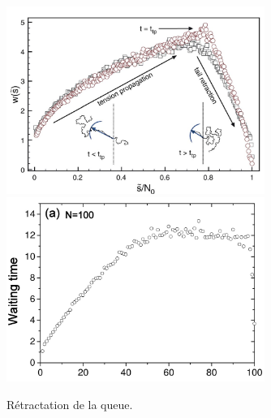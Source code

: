  \begin{figure}[H]
\begin{center}
\includegraphics[width=0.75\textwidth]{tailretractinpore.jpg}
\includegraphics[width=0.75\textwidth]{tailretractpulling.jpg} 

\caption[Temps d'attente et rétractation de la queue du polymère]{Rétractation de la queue.}
\label{regimeprofiles}
\end{center}
\end{figure}

